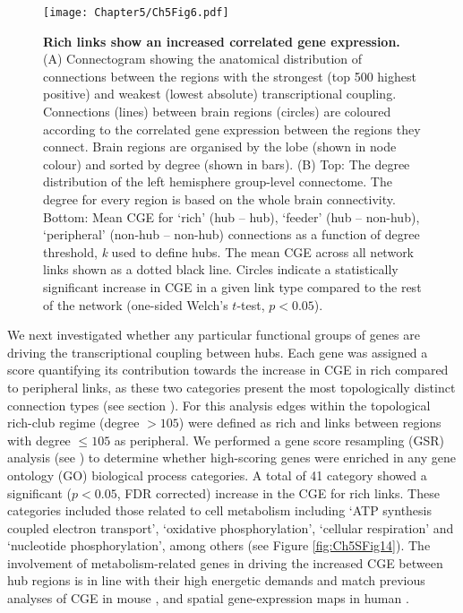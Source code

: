 \begin{figure}[h!]
\begin{center}
\texttt{[image: Chapter5/Ch5Fig6.pdf]}%
\end{center}
\caption{\textbf{Rich links show an increased correlated gene expression.}
(A) Connectogram showing the anatomical distribution of connections between the regions with the strongest (top 500 highest positive) and weakest (lowest absolute) transcriptional coupling. Connections (lines) between brain regions (circles) are coloured according to the correlated gene expression between the regions they connect. Brain regions are organised by the lobe (shown in node colour) and sorted by degree (shown in bars). 
(B) Top: The degree distribution of the left hemisphere group-level connectome. The degree for every region is based on the whole brain connectivity. Bottom: Mean CGE for `rich' (hub -- hub), `feeder' (hub -- non-hub), `peripheral' (non-hub -- non-hub) connections as a function of degree threshold, \textit{k} used to define hubs. The mean CGE across all network links shown as a dotted black line. Circles indicate a statistically significant increase in CGE in a given link type compared to the rest of the network (one-sided Welch's $t$-test, $p < 0.05$).}
\label{fig:Ch5Fig6}
\end{figure}

We next investigated whether any particular functional groups of genes are driving the transcriptional coupling between hubs. Each gene was assigned a score quantifying its contribution towards the increase in CGE in rich compared to peripheral links, as these two categories present the most topologically distinct connection types (see section ). For this analysis edges within the topological rich-club regime (degree $> 105$) were defined as rich and links between regions with degree $\leq105$ as peripheral. We performed a gene score resampling (GSR) analysis (see ) to determine whether high-scoring genes were enriched in any gene ontology (GO) biological process categories. A total of 41 category showed a significant ($p<0.05$, FDR corrected) increase in the CGE for rich links. These categories included those related to cell metabolism including `ATP synthesis coupled electron transport', `oxidative phosphorylation', `cellular respiration' and `nucleotide phosphorylation', among others (see Figure \ref{fig:Ch5SFig14}). The involvement of metabolism-related genes in driving the increased CGE between hub regions is in line with their high energetic demands \citep{Bullmore2012,Collin2014,Liang2013a,Tomasi2013} and match previous analyses of CGE in mouse \citep{Fulcher2016}, and spatial gene-expression maps in human \citep{Vertes2016b}.

